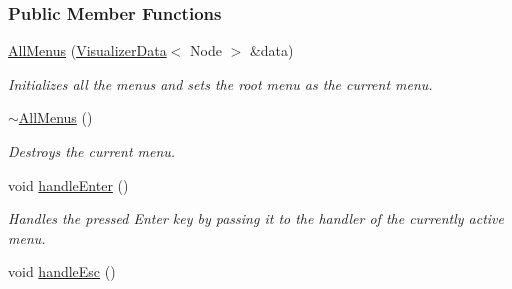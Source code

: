 \subsubsection*{Public Member Functions}
\begin{DoxyCompactItemize}
\item 
\hyperlink{structslb_1_1core_1_1ui_1_1AllMenus_a0f13032d8c5a062c2dbb87b34d489ada}{All\+Menus} (\hyperlink{structslb_1_1core_1_1ui_1_1VisualizerData}{Visualizer\+Data}$<$ Node $>$ \&data)
\begin{DoxyCompactList}\small\item\em Initializes all the menus and sets the root menu as the current menu. \end{DoxyCompactList}\item 
\hyperlink{structslb_1_1core_1_1ui_1_1AllMenus_a0e46f55a2aac343cecd8a4b228126f47}{$\sim$\+All\+Menus} ()\hypertarget{structslb_1_1core_1_1ui_1_1AllMenus_a0e46f55a2aac343cecd8a4b228126f47}{}\label{structslb_1_1core_1_1ui_1_1AllMenus_a0e46f55a2aac343cecd8a4b228126f47}

\begin{DoxyCompactList}\small\item\em Destroys the current menu. \end{DoxyCompactList}\item 
void \hyperlink{structslb_1_1core_1_1ui_1_1AllMenus_a6deff049a64083c84141287f6f5679bd}{handle\+Enter} ()\hypertarget{structslb_1_1core_1_1ui_1_1AllMenus_a6deff049a64083c84141287f6f5679bd}{}\label{structslb_1_1core_1_1ui_1_1AllMenus_a6deff049a64083c84141287f6f5679bd}

\begin{DoxyCompactList}\small\item\em Handles the pressed Enter key by passing it to the handler of the currently active menu. \end{DoxyCompactList}\item 
void \hyperlink{structslb_1_1core_1_1ui_1_1AllMenus_af791972ca9bc24750ebd4b529fce6eea}{handle\+Esc} ()\hypertarget{structslb_1_1core_1_1ui_1_1AllMenus_af791972ca9bc24750ebd4b529fce6eea}{}\label{structslb_1_1core_1_1ui_1_1AllMenus_af791972ca9bc24750ebd4b529fce6eea}


\end{DoxyCompactItemize}
